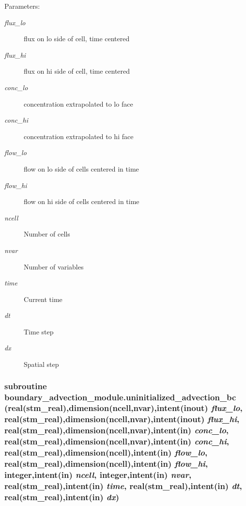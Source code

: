 \begin{Desc}
\item[Parameters:]
\begin{description}
\item[{\em flux\_\-lo}]flux on lo side of cell, time centered\item[{\em flux\_\-hi}]flux on hi side of cell, time centered\item[{\em conc\_\-lo}]concentration extrapolated to lo face\item[{\em conc\_\-hi}]concentration extrapolated to hi face\item[{\em flow\_\-lo}]flow on lo side of cells centered in time\item[{\em flow\_\-hi}]flow on hi side of cells centered in time\item[{\em ncell}]Number of cells\item[{\em nvar}]Number of variables\item[{\em time}]Current time\item[{\em dt}]Time step \item[{\em dx}]Spatial step \end{description}
\end{Desc}
\hypertarget{a00053_26eb82e9a6eae1dd87145fafd01bd2ae}{
\subsubsection[{uninitialized\_\-advection\_\-bc}]{\setlength{\rightskip}{0pt plus 5cm}subroutine boundary\_\-advection\_\-module.uninitialized\_\-advection\_\-bc (real(stm\_\-real),dimension(ncell,nvar),intent(inout) {\em flux\_\-lo}, \/  real(stm\_\-real),dimension(ncell,nvar),intent(inout) {\em flux\_\-hi}, \/  real(stm\_\-real),dimension(ncell,nvar),intent(in) {\em conc\_\-lo}, \/  real(stm\_\-real),dimension(ncell,nvar),intent(in) {\em conc\_\-hi}, \/  real(stm\_\-real),dimension(ncell),intent(in) {\em flow\_\-lo}, \/  real(stm\_\-real),dimension(ncell),intent(in) {\em flow\_\-hi}, \/  integer,intent(in) {\em ncell}, \/  integer,intent(in) {\em nvar}, \/  real(stm\_\-real),intent(in) {\em time}, \/  real(stm\_\-real),intent(in) {\em dt}, \/  real(stm\_\-real),intent(in) {\em dx})}}
\label{a00053_26eb82e9a6eae1dd87145fafd01bd2ae}


